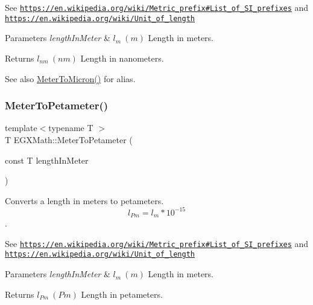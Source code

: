 See \href{https://en.wikipedia.org/wiki/Metric_prefix#List_of_SI_prefixes}{\tt https\+://en.\+wikipedia.\+org/wiki/\+Metric\+\_\+prefix\#\+List\+\_\+of\+\_\+\+S\+I\+\_\+prefixes} and \href{https://en.wikipedia.org/wiki/Unit_of_length}{\tt https\+://en.\+wikipedia.\+org/wiki/\+Unit\+\_\+of\+\_\+length} 
\begin{DoxyParams}{Parameters}
{\em length\+In\+Meter} & $ l_{m}\ (m)$ Length in meters. \\
\hline
\end{DoxyParams}
\begin{DoxyReturn}{Returns}
$ l_{nm}\ (nm)$ Length in nanometers. 
\end{DoxyReturn}
\begin{DoxySeeAlso}{See also}
\mbox{\hyperlink{group___e_g_x_math-_conversions-_length_conversions-_s_i-_meter-_non-_s_i_ga9655833d43ede59b17c54a6f06f9681a}{Meter\+To\+Micron()}} for alias. 
\end{DoxySeeAlso}
\mbox{\label{group___e_g_x_math-_conversions-_length_conversions-_s_i-_meter-_s_i_gaf808f7191ee069df013a26281f227388}} 
\subsubsection{\texorpdfstring{Meter\+To\+Petameter()}{MeterToPetameter()}}
{\footnotesize\ttfamily template$<$typename T $>$ \\
T E\+G\+X\+Math\+::\+Meter\+To\+Petameter (\begin{DoxyParamCaption}\item[{const T}]{length\+In\+Meter }\end{DoxyParamCaption})}



Converts a length in meters to petameters. \[ l_{Pm}=l_{m} * 10^{-15} \]. 

See \href{https://en.wikipedia.org/wiki/Metric_prefix#List_of_SI_prefixes}{\tt https\+://en.\+wikipedia.\+org/wiki/\+Metric\+\_\+prefix\#\+List\+\_\+of\+\_\+\+S\+I\+\_\+prefixes} and \href{https://en.wikipedia.org/wiki/Unit_of_length}{\tt https\+://en.\+wikipedia.\+org/wiki/\+Unit\+\_\+of\+\_\+length} 
\begin{DoxyParams}{Parameters}
{\em length\+In\+Meter} & $ l_{m}\ (m)$ Length in meters. \\
\hline
\end{DoxyParams}
\begin{DoxyReturn}{Returns}
$ l_{Pm}\ (Pm)$ Length in petameters. 
\end{DoxyReturn}
\mbox{\label{group___e_g_x_math-_conversions-_length_conversions-_s_i-_meter-_s_i_ga5e136454c20254062d6e8637cfbfb8ee}} 
